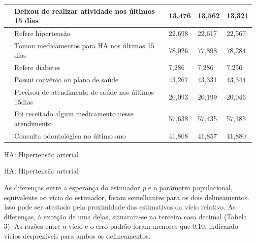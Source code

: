 \documentclass{article}
\begin{document}
\begin{table}
\begin{xtabular}{ l | l | l l | l }
& Deixou de realizar atividade nos últimos 15 dias
& 13,476
& 13,562
& 13,321
\\ \hline

& Refere hipertensão
& 22,698
& 22,617
& 22,567
\\ \hline

& Tomou medicamentos para HA nos últimos 15 dias
& 78,026
& 77,898
& 78,284
\\ \hline

& Refere diabetes
& 7,286
& 7,286
& 7,256
\\ \hline

& Possui convênio ou plano de saúde
& 43,267
& 43,331
& 43,344
\\ \hline

& Precisou de atendimento de saúde nos últimos 15dias
& 20,093
& 20,199
& 20,046
\\ \hline

& Foi receitado algum medicamento nesse atendimento
& 57,638
& 57,435
& 57,185
\\ \hline

& Consulta odontológica no último ano
& 41,808
& 41,857
& 41,880
\\ \hline

\end{xtabular}
\end{table}

HA: Hipertensão arterial

HA: Hipertensão arterial

As diferenças entre a esperança do estimador \textit{p}
e o parâmetro populacional, equivalente ao vício do estimador, foram semelhantes
para os dois delineamentos. Isso pode ser atestado pela proximidade das
estimativas do vício relativo. As diferenças, à exceção de uma delas,
situaram-se na terceira casa decimal (Tabela 3). As razões entre o vício e o
erro padrão foram menores que 0,10, indicando vícios desprezíveis para ambos os
delineamentos.
\end{document}

